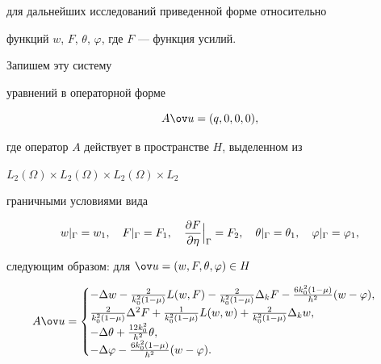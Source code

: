 для дальнейших исследований приведенной форме относительно 


функций $w$, $F$, $\theta$, $\varphi$, где $F$ --- функция усилий. 


Запишем эту систему 


уравнений в операторной форме 


$$ 


A\ov u=(q,0,0,0), 


$$ 


где оператор $A$ действует в пространстве $H$, выделенном из 


$L_2(\Omega)\times L_2(\Omega)\times L_2(\Omega)\times L_2$ 


граничными условиями вида 


\begin{equation} 


w|_\Gamma=w_1,\quad F|_\Gamma=F_1,\quad \Bigl. 


\frac{\partial F}{\partial\eta}\Bigr|_\Gamma=F_2,\quad 


\theta|_\Gamma=\theta_1,\quad \varphi|_\Gamma=\varphi_1, 


\end{equation} 


следующим образом: для $\ov u=(w,F,\theta,\varphi)\in H$ 


\begin{equation} 


A\ov u= 


\begin{cases} 


-\Delta w-\frac{2}{k^2_0(1-\mu)}L(w,F)- 


\frac{2}{k^2_0(1-\mu)}\Delta_k F- 


\frac{6k^2_0(1-\mu)}{h^2}(w-\varphi),\\ 


\frac{2}{k^2_0(1-\mu)}\Delta^2F+\frac{1}{k^2_0(1-\mu)} 


L(w,w)+\frac{2}{k^2_0(1-\mu)}\Delta_k w,\\ 


-\Delta\theta+\frac{12k^2_0}{h^2}\theta,\\ 


-\Delta\varphi-\frac{6k^2_0(1-\mu)}{h^2}(w-\varphi). 


\end{cases} 


\end{equation} 


 


